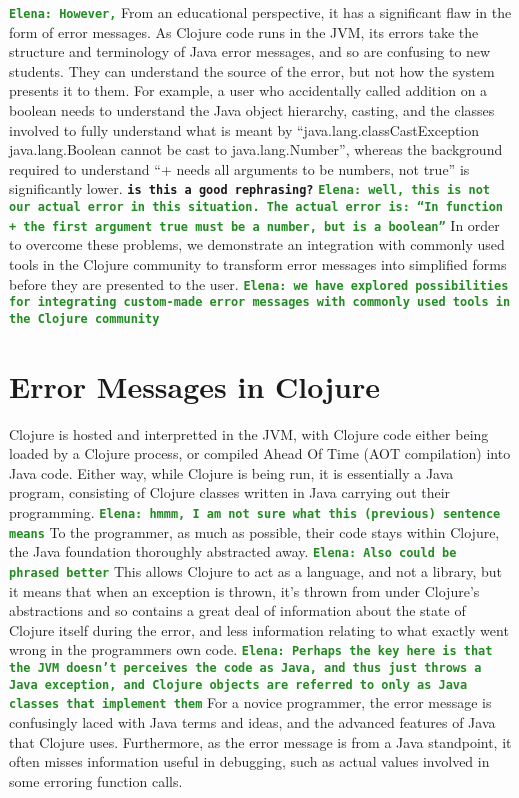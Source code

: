 \documentclass[12pt]{article}
\newcommand{\comment}[1]{{\bf \tt  {#1}}}
\newcommand{\emcomment}[1]{\textcolor{ForestGreen}{\comment{Elena: {#1}}}}
\begin{document}
\emcomment{However,} From an educational perspective, it has a significant flaw in the form of error messages.
As Clojure code runs in the JVM, its errors take the structure and terminology of Java error messages,
and so are confusing to new students. They can understand the source of the error,
but not how the system presents it to them.
For example, a user who accidentally called addition on a boolean needs
 to understand the Java object hierarchy, casting,
 and the classes involved to fully understand what is meant by
 ``java.lang.classCastException java.lang.Boolean cannot be cast to java.lang.Number'',
whereas the background required to understand ``+ needs all arguments to be numbers, not true''
 is significantly lower. \comment{is this a good rephrasing?} \emcomment{well, this is not our actual error in this situation. The actual error is:
``In function + the first argument true must be a number, but is a boolean''} 
 In order to overcome these problems,
  we demonstrate an integration with commonly used tools in the Clojure community
 to transform error messages into simplified forms before they are presented to the user.
\emcomment{we have explored possibilities for integrating custom-made error messages with commonly used tools in the Clojure community}




\section{Error Messages in Clojure}
Clojure is hosted and interpretted in the JVM, with Clojure code either being
loaded by a Clojure process, or compiled Ahead Of Time (AOT compilation) into Java code.
Either way, while Clojure is being run, it is essentially a Java program, consisting of
Clojure classes written in Java carrying out their programming. 
\emcomment{hmmm, I am not sure what this (previous) sentence means}
To the programmer, as much as possible, their code stays within Clojure,
the Java foundation thoroughly abstracted away.
\emcomment{Also could be phrased better}
This allows Clojure to act as a language, and not a library, but it means
 that when an exception is thrown, it's thrown from under Clojure's abstractions
 and so contains a great deal of information about the state of Clojure itself
 during the error, and less information relating to what exactly went wrong in the
 programmers own code.
\emcomment{Perhaps the key here is that the JVM doesn't perceives the code as Java, and thus just throws a Java exception,
and Clojure objects are referred to only as Java classes that implement them}
 For a novice programmer, the error message is confusingly laced
  with Java terms and ideas, and the advanced features of Java that Clojure uses.
  Furthermore, as the error message is from a Java standpoint, it often misses
  information useful in debugging, such as actual values involved in some erroring function calls.
\end{document}
